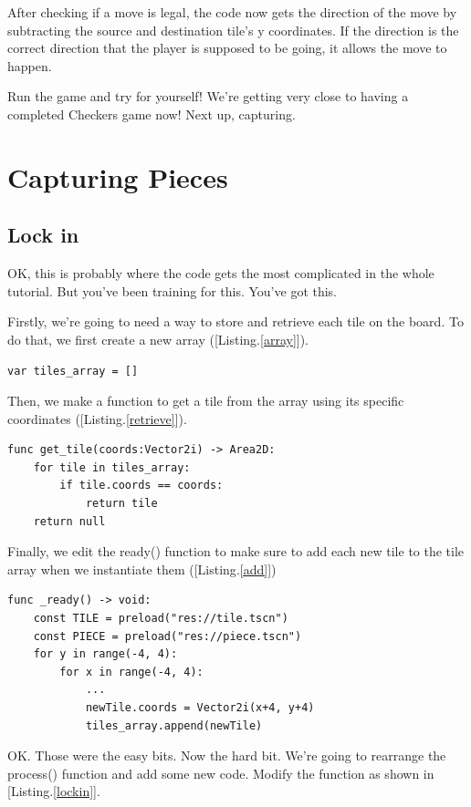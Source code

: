 \documentclass[14pt]{extarticle}
\newcommand{\prettyref}[2]{[{#1}.\ref{#2}]}
\begin{document}
After checking if a move is legal, the code now gets the direction of the move by subtracting the source and destination tile's y coordinates. If the direction is the correct direction that the player is supposed to be going, it allows the move to happen.

Run the game and try for yourself! We're getting very close to having a completed Checkers game now! Next up, capturing.

\section{Capturing Pieces}
\subsection*{Lock in}
OK, this is probably where the code gets the most complicated in the whole tutorial. But you've been training for this. You've got this.

Firstly, we're going to need a way to store and retrieve each tile on the board. To do that, we first create a new array (\prettyref{Listing}{array}).

\begin{lstlisting}[language=gdscript, label={array}, caption=Tile array]
var tiles_array = []
\end{lstlisting}

Then, we make a function to get a tile from the array using its specific coordinates (\prettyref{Listing}{retrieve}).

\begin{lstlisting}[language=gdscript, label={array}, caption=Retrieve tiles]
func get_tile(coords:Vector2i) -> Area2D:
	for tile in tiles_array:
		if tile.coords == coords:
			return tile
	return null
\end{lstlisting}

Finally, we edit the ready() function to make sure to add each new tile to the tile array when we instantiate them (\prettyref{Listing}{add})

\begin{lstlisting}[language=gdscript, label={add}, caption=Adding tiles to the array]
func _ready() -> void:
	const TILE = preload("res://tile.tscn")
	const PIECE = preload("res://piece.tscn")
	for y in range(-4, 4):
		for x in range(-4, 4):
			...
			newTile.coords = Vector2i(x+4, y+4)
			tiles_array.append(newTile)
\end{lstlisting}

OK. Those were the easy bits. Now the hard bit. We're going to rearrange the process() function and add some new code. Modify the function as shown in \prettyref{Listing}{lockin}.
\end{document}
